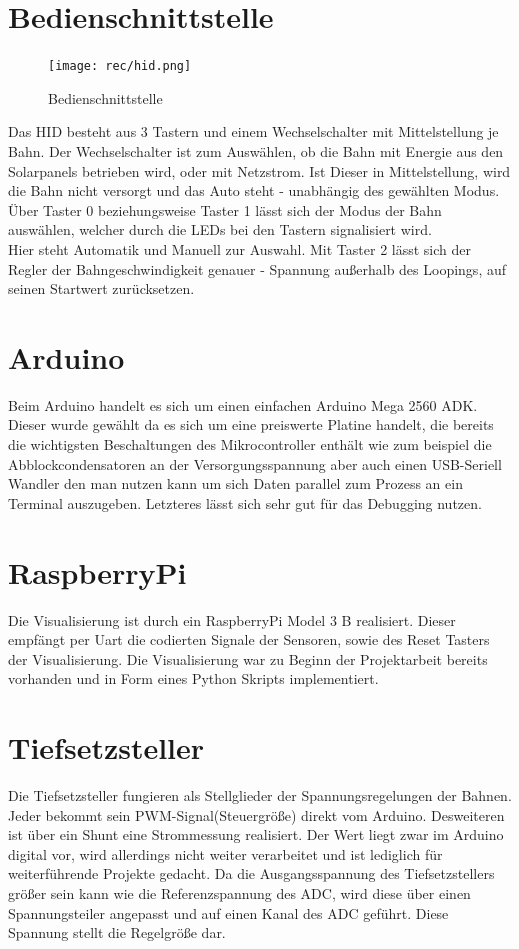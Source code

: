 \documentclass[a4paper, 11pt]{report}
\begin{document}
	\section{Bedienschnittstelle}
		\begin{figure}[ht]
			\centering
			\texttt{[image: rec/hid.png]}
			\caption{Bedienschnittstelle}
			\label{img:hid}
		\end{figure}
		Das HID besteht aus 3 Tastern und einem Wechselschalter mit Mittelstellung je Bahn.
		Der Wechselschalter ist zum Auswählen, ob die Bahn mit Energie aus den Solarpanels betrieben wird, oder mit Netzstrom. Ist Dieser in Mittelstellung, wird die Bahn nicht versorgt und das Auto steht - unabhängig des gewählten Modus.
		Über Taster 0 beziehungsweise Taster 1 lässt sich der Modus der Bahn auswählen, welcher durch die LEDs bei den Tastern signalisiert wird. \\Hier steht Automatik und Manuell zur Auswahl.
		Mit Taster 2 lässt sich der Regler der Bahngeschwindigkeit genauer -  Spannung außerhalb des Loopings, auf seinen Startwert zurücksetzen.
	\section{Arduino}
		Beim Arduino handelt es sich um einen einfachen Arduino Mega 2560 ADK.\\
		Dieser wurde gewählt da es sich um eine preiswerte Platine handelt, die bereits die wichtigsten Beschaltungen des Mikrocontroller enthält wie zum beispiel die Abblockcondensatoren an der Versorgungsspannung aber auch einen USB-Seriell Wandler den man nutzen kann um sich Daten parallel zum Prozess an ein Terminal auszugeben.
		Letzteres lässt sich sehr gut für das Debugging nutzen.
	\section{RaspberryPi}
		Die Visualisierung ist durch ein RaspberryPi Model 3 B realisiert. Dieser empfängt per Uart die codierten Signale der Sensoren, sowie des Reset Tasters der Visualisierung.
		Die Visualisierung war zu Beginn der Projektarbeit bereits vorhanden und in Form eines Python Skripts implementiert.
	\section{Tiefsetzsteller}
		Die Tiefsetzsteller fungieren als Stellglieder der Spannungsregelungen der Bahnen.
		Jeder bekommt sein PWM-Signal(Steuergröße) direkt vom Arduino. Desweiteren ist über ein Shunt eine
		Strommessung realisiert. Der Wert liegt zwar im Arduino digital vor, wird allerdings nicht weiter
		verarbeitet und ist lediglich für weiterführende Projekte gedacht. Da die Ausgangsspannung des
		Tiefsetzstellers größer sein kann wie die Referenzspannung des ADC,
		wird diese über einen Spannungsteiler angepasst und auf einen Kanal des ADC geführt.
		Diese Spannung stellt die Regelgröße dar.
	\newpage
\end{document}
